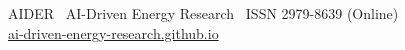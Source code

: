 \documentclass[11pt]{article}
\begin{document}
\vfill
\begin{center}
{\footnotesize\sffamily\color{ink3}
AIDER \textbar\ AI-Driven Energy Research \textbar\ ISSN 2979-8639 (Online)\\
\href{https://ai-driven-energy-research.github.io}{ai-driven-energy-research.github.io}}
\end{center}
\end{document}
